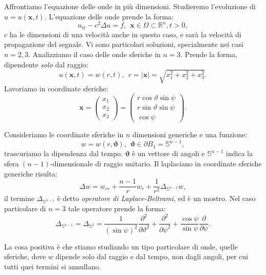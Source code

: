 \documentclass[10pt,a4paper,twoside,openright]{book}
\begin{document}
Affrontiamo l'equazione delle onde in più dimensioni. Studieremo l'evoluzione di $u=u(\mathbf{x} ,t)$. L'equazione delle onde prende la forma:
\begin{equation}
	u_{tt} -c^{2} \Delta u=f,\ \ \mathbf{x} \in \Omega \subset \mathbb{R}^{n} ,t >0,
\end{equation}
$c$ ha le dimensioni di una velocità anche in questo caso, e sarà la velocità di propagazione del segnale. Vi sono particolari soluzioni, specialmente nei casi $n=2,3$. Analizziamo il caso delle onde sferiche in $n=3$. Prende la forma, dipendente \textit{solo} dal raggio:
\begin{equation*}
	u(\mathbf{x} ,t) =w( r,t) ,\ \ r=| \mathbf{x}| =\sqrt{x_{1}^{2} +x_{2}^{2} +x_{3}^{2}} .
\end{equation*}
Lavoriamo in coordinate sferiche:
\begin{equation*}
	\mathbf{x} =
	\begin{pmatrix}
		x_{1} \\
		x_{2} \\
		x_{3} 
	\end{pmatrix} =
	\begin{pmatrix}
		r\cos \vartheta \sin \psi \\
		r\sin \vartheta \sin \psi \\
		\cos \psi                 
	\end{pmatrix} .
\end{equation*}
\begin{nb}
	Consideriamo le coordinate sferiche in $n$ dimensioni generiche e una funzione:
	\begin{equation*}
		w=w( r,\bm{\vartheta }) ,\ \ \bm{\vartheta } \in \partial B_{1} =\mathbb{S}^{n-1} ,
	\end{equation*}
	trascuriamo la dipendenza dal tempo. $\bm{\vartheta }$ è un vettore di angoli e $\mathbb{S}^{n-1}$ indica la sfera $( n-1)$-dimensionale di raggio unitario. Il laplaciano in coordinate sferiche generiche risulta:
	\begin{equation}
		\Delta w=w_{rr} +\frac{n-1}{r} w_{r} +\frac{1}{r^{2}} \Delta _{\mathbb{S}^{n-1}} w,
	\end{equation}
	il termine $\Delta _{\mathbb{S}^{n-1}}$ è detto \textit{operatore di Laplace-Beltrami}, ed è un mostro. Nel caso particolare di $n=3$ tale operatore prende la forma:
	\begin{equation}
		\Delta _{\mathbb{S}^{n-1}} =\Delta _{\mathbb{S}^{2}} =\frac{1}{(\sin \psi )^{2}}\frac{\partial ^{2}}{\partial \vartheta ^{2}} +\frac{\partial ^{2}}{\partial \psi ^{2}} +\frac{\cos \psi }{\sin \psi }\frac{\partial }{\partial \psi } .
	\end{equation}
\end{nb}
La cosa positiva è che stiamo studiando un tipo particolare di onde, quelle sferiche, dove $w$ dipende solo dal raggio e dal tempo, non dagli angoli, per cui tutti quei termini si annullano.
\end{document}
